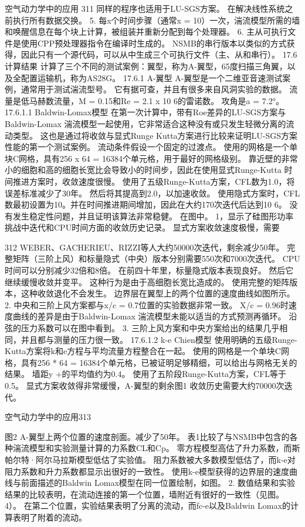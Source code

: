 \documentclass[UTF8,11pt,a4paper,openany,fontset=fandol]{ctexbook}
\begin{document}
空气动力学中的应用 311 同样的程序也适用于LU-SGS方案。 在解决线性系统之前执行所有数据交换。 5. 每x个时间步骤（通常x = 10）一次，湍流模型所需的墙和唤醒信息在每个块上计算，被组装并重新分配到每个处理器。 6. 主从可执行文件是使用CPP预处理器指令在编译时生成的。 NSMB的串行版本以类似的方式获得，因此只有一个源代码，可以从中生成三个可执行文件（主、从和串行）。 17.6 计算结果 计算了三个不同的测试案例：翼型，称为A-翼型，65度扫描三角翼，以及全配置运输机，称为AS28G。 17.6.1 A-翼型 A-翼型是一个二维亚音速测试案例，通常用于测试湍流型号。 它有据可查，并且有很多来自风洞实验的数据。 流量是低马赫数流量，M = 0.15和Re = 2.1 x 10 6的雷诺数。 攻角是a = 7.2°。 17.6.1.1 Baldwin-Lomax模型 在第一次计算中，带有Roe差异的LU-SGS方案与Baldwin-Lomax 湍流模型一起使用，它非常适合这种没有或只发生轻微分离的流动类型。 这也是通过将收敛与显式Runge Kutta方案进行比较来证明LU-SGS方案性能的第一个测试案例。 流动条件假设一个固定的过渡点。 使用的网格是一个单块C网格，具有256 x 64 = 16384个单元格，用于最好的网格级别。 靠近壁的非常小的细胞和高的细胞长宽比会导致小的时间步，因此在使用显式Runge-Kutta 时间推进方案时，收敛速度很慢。 使用了五级Runge-Kutta方案，CFL数为1.0，将误差标准减少了30年。 然后将其提高到2.0，以加速收敛。 使用隐式方案时，CFL数最初设置为10。并在时间推进期间增加，因此在大约170次迭代后达到10 6。 没有发生稳定性问题，并且证明该算法非常稳健。 在图中。 1，显示了硅图形功率挑战中迭代和CPU时间方面的收敛历史记录。 显式方案收敛速度极慢，需要

312 WEBER、GACHERIEU、RIZZI等人大约50000次迭代，剩余减少50年。 完整矩阵（三阶上风）和标量隐式（中央）版本分别需要550次和7000次迭代。 CPU时间可以分别减少32倍和8倍。 在前四十年里，标量隐式版本表现良好。 然后它继续缓慢收敛并变平。 这种行为是由于高细胞长宽比造成的。 使用完整的矩阵版本，这种收敛退化不会发生。 边界层在翼型上的两个位置的速度曲线如图所示。 2. 中央和三阶上风方案都与x/c = 0.7位置的实验数据非常一致。 X/c = 0.96时速度曲线的差异是由于Baldwin-Lomax 湍流模型未能以适当的方式预测再循环。 沿弦的压力系数可以在图中看到。 3. 三阶上风方案和中央方案给出的结果几乎相同，并且都与测量的压力很一致。 17.6.1.2 k-e Chien模型 使用明确的五级Runge-Kutta方案将k和e方程与平均流量方程整合在一起。 使用的网格是一个单块C网格，具有256 * 64 = 16384个单元格，已被证明足够精细，可以给出与网格无关的结果。 墙距y +的平均值约为0.4。 使用了五阶段Runge-Kutta方案，CFL等于0.5。 显式方案收敛得非常缓慢，A-翼型的剩余图1 收敛历史需要大约70000次迭代。

空气动力学中的应用313

图2 A-翼型上两个位置的速度剖面。减少了50年。 表1比较了与NSMB中包含的各种湍流模型和实验测量计算的力系数CL和Cp。 零方程模型高估了升力系数，而斯帕尔特·阿尔马拉斯模型低估了实验值。 阻力系数被大多数模型低估了，而k-e对阻力系数和升力系数都显示出很好的一致性。 使用k-e模型获得的边界层的速度曲线与前面描述的Baldwin Lomax模型在同一位置绘制，如图。 2. 数值结果和实验结果的比较表明，在流动连接的第一个位置，墙附近有很好的一致性（见图。 4）。 在第二个位置，实验结果表明了分离的流动，而fc-e以及Baldwin Lomax的计算表明了附着的流动。
\end{document}
